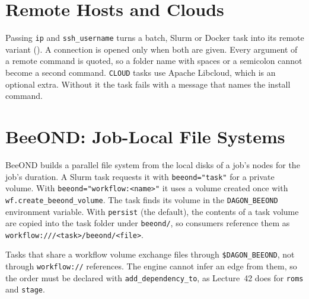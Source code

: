 

\section{Remote Hosts and Clouds}

Passing \texttt{ip} and \texttt{ssh\_username} turns a batch, Slurm or Docker
task into its remote variant (). A connection
is opened only when both are given. Every argument of a remote command is
quoted, so a folder name with spaces or a semicolon cannot become a second
command. \texttt{CLOUD} tasks use Apache Libcloud, which is an optional extra.
Without it the task fails with a message that names the install command.



\section{BeeOND: Job-Local File Systems}

BeeOND builds a parallel file system from the local disks of a job's nodes
for the job's duration. A Slurm task requests it with \texttt{beeond="task"}
for a private volume. With \texttt{beeond="workflow:<name>"} it uses a volume
created once with \texttt{wf.create\_beeond\_volume}. The task finds its volume
in the \texttt{DAGON\_BEEOND} environment variable. With \texttt{persist}
(the default), the contents of a task volume are copied into the task folder
under \texttt{beeond/}, so consumers reference them as
\texttt{workflow:///<task>/beeond/<file>}.





\begin{cautionbox}
Tasks that share a workflow volume exchange files through
\texttt{\$DAGON\_BEEOND}, not through \texttt{workflow://} references. The
engine cannot infer an edge from them, so the order must be declared with
\texttt{add\_dependency\_to}, as Lecture~42 does for \texttt{roms} and
\texttt{stage}.
\end{cautionbox}

